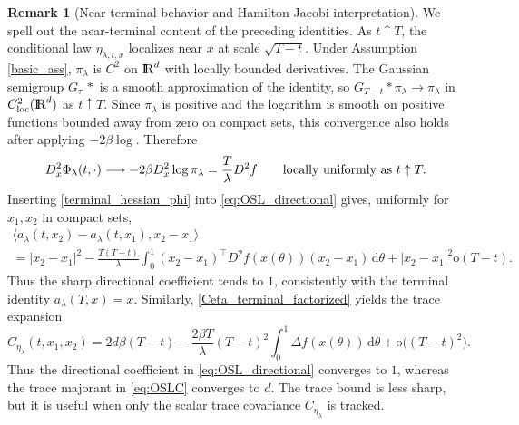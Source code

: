 \documentclass[11pt]{amsart}
\def\R{\mathrm{I\kern-0.21emR}}
\newcommand{\dd}{\,\mathrm{d}}
\renewcommand{\Vert}{|}
\numberwithin{equation}{section}
\numberwithin{figure}{section}
\theoremstyle{definition}\newtheorem{remark}[theorem]{Remark}%
\begin{document}
\begin{remark}[Near-terminal behavior and Hamilton-Jacobi interpretation]\label{terminal_semiconcavity_rem}
We spell out the near-terminal content of the preceding identities. As $t\uparrow T$, the conditional law $\eta_{\lambda,t,x}$ localizes near $x$ at scale $\sqrt{T-t}$. Under Assumption \ref{basic_ass}, $\pi_\lambda$ is $C^2$ on $\R^d$ with locally bounded derivatives. The Gaussian semigroup $G_\tau\,*$ is a smooth approximation of the identity, so $G_{T-t}*\pi_\lambda \to \pi_\lambda$ in $C^2_{\mathrm{loc}}(\R^d)$ as $t\uparrow T$. Since $\pi_\lambda$ is positive and the logarithm is smooth on positive functions bounded away from zero on compact sets, this convergence also holds after applying $-2\beta\log$. Therefore
\begin{equation}\label{terminal_hessian_phi}
D_x^2\Phi_\lambda(t,\cdot)
\longrightarrow -2\beta D_x^2\log\pi_\lambda = \frac{T}{\lambda}D^2f
\qquad\hbox{locally uniformly as } t\uparrow T.
\end{equation}
Inserting \eqref{terminal_hessian_phi} into \eqref{eq:OSL_directional} gives, uniformly for $x_1,x_2$ in compact sets,
\begin{multline}\label{terminal_directional_osl}
\big\langle a_\lambda(t,x_2)-a_\lambda(t,x_1),x_2-x_1\big\rangle \\
= \Vert x_2-x_1\Vert^2 - \frac{T(T-t)}{\lambda}\int_0^1 (x_2-x_1)^\top D^2f(x(\theta))(x_2-x_1)\dd\theta 
+ \Vert x_2-x_1\Vert^2\mathrm{o}(T-t).
\end{multline}
Thus the sharp directional coefficient tends to $1$, consistently with the terminal identity $a_\lambda(T,x)=x$. Similarly, \eqref{Ceta_terminal_factorized} yields the trace expansion
\begin{equation}\label{Ceta_terminal_expansion}
C_{\eta_\lambda}(t,x_1,x_2)
= 2d\beta(T-t) - \frac{2\beta T}{\lambda}(T-t)^2\int_0^1\Delta f(x(\theta))\dd\theta + \mathrm{o}\big((T-t)^2\big).
\end{equation}
Thus the directional coefficient in \eqref{eq:OSL_directional} converges to $1$, whereas the trace majorant in \eqref{eq:OSLC} converges to $d$. The trace bound is less sharp, but it is useful when only the scalar trace covariance $C_{\eta_\lambda}$ is tracked.


\end{remark}
\end{document}
